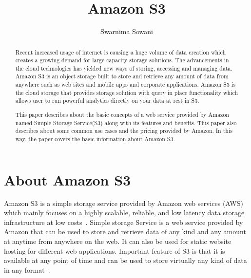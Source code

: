 
\title{Amazon S3}


\author{Swarnima Sowani}


\renewcommand{\shortauthors}{G. v. Laszewski}

\begin{abstract}

Recent increased usage of internet is causing a huge volume of data creation
which creates a growing demand for large capacity storage solutions. The
advancements in the cloud technologies has yielded new ways of storing,
accessing and managing data. Amazon S3 is an object storage built to store and retrieve any amount
of data from anywhere such as web sites and mobile apps and corporate
applications. Amazon S3 is the cloud storage that provides storage solution
with query in place functionality which allows user to run powerful analytics
directly on your data at rest in S3.

This paper describes about the basic concepts of a web service provided by
Amazon named Simple Storage Service(S3)
along with its features and benefits. This paper also describes about some
common use cases and the pricing provided by
Amazon. In this way, the paper covers the basic information about Amazon S3.

\end{abstract}


\maketitle

\section{About Amazon S3}

Amazon S3 is a simple storage service provided by Amazon web services (AWS)
which mainly focuses on a highly scalable, reliable, and low latency data
storage infrastructure at low costs~\cite{hid-sp18-420-amazon-S3-FAQ}. Simple
storage Service is a web service provided by Amazon that can be used to store
and retrieve data of any kind and any amount at anytime from anywhere on the
web. It can also be used for static website hosting for different web
applications. Important feature of S3 is that it is available at any point of
time and can be used to store virtually any kind of data in any
format~\cite{hid-sp18-420-amazon-S3-FAQ}.

